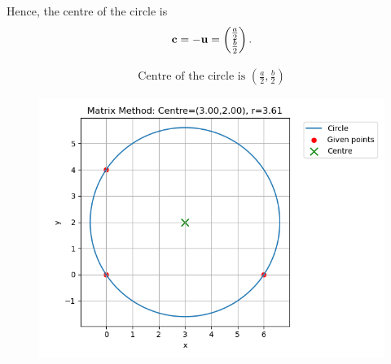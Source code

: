 \documentclass[12pt]{article}
\begin{document}
Hence, the centre of the circle is
\begin{align}
\mathbf{c} = -\mathbf{u} = \begin{pmatrix}\tfrac{a}{2} \\ \tfrac{b}{2}\end{pmatrix}.
\end{align}

\begin{align}
\boxed{\text{Centre of the circle is } \left(\tfrac{a}{2}, \tfrac{b}{2}\right)}
\end{align}

\begin{figure}[H]
    \centering
    \includegraphics[width=0.9\columnwidth]{figs/newcentre.png}
    \caption{}
    \label{fig:placeholder}
\end{figure}
\end{document}
